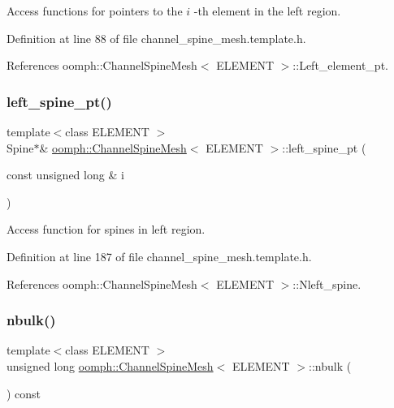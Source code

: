 Access functions for pointers to the $ i $ -\/th element in the left region. 



Definition at line 88 of file channel\+\_\+spine\+\_\+mesh.\+template.\+h.



References oomph\+::\+Channel\+Spine\+Mesh$<$ E\+L\+E\+M\+E\+N\+T $>$\+::\+Left\+\_\+element\+\_\+pt.

\mbox{\label{classoomph_1_1ChannelSpineMesh_ad4ae203f8a69fa3c8f0541ede45d7630}} 
\subsubsection{\texorpdfstring{left\+\_\+spine\+\_\+pt()}{left\_spine\_pt()}}
{\footnotesize\ttfamily template$<$class E\+L\+E\+M\+E\+NT $>$ \\
Spine$\ast$\& \hyperlink{classoomph_1_1ChannelSpineMesh}{oomph\+::\+Channel\+Spine\+Mesh}$<$ E\+L\+E\+M\+E\+NT $>$\+::left\+\_\+spine\+\_\+pt (\begin{DoxyParamCaption}\item[{const unsigned long \&}]{i }\end{DoxyParamCaption})\hspace{0.3cm}{\ttfamily [inline]}}



Access function for spines in left region. 



Definition at line 187 of file channel\+\_\+spine\+\_\+mesh.\+template.\+h.



References oomph\+::\+Channel\+Spine\+Mesh$<$ E\+L\+E\+M\+E\+N\+T $>$\+::\+Nleft\+\_\+spine.

\mbox{\label{classoomph_1_1ChannelSpineMesh_a89f5523009288ce87d2f0d1cbb9fb488}} 
\subsubsection{\texorpdfstring{nbulk()}{nbulk()}}
{\footnotesize\ttfamily template$<$class E\+L\+E\+M\+E\+NT $>$ \\
unsigned long \hyperlink{classoomph_1_1ChannelSpineMesh}{oomph\+::\+Channel\+Spine\+Mesh}$<$ E\+L\+E\+M\+E\+NT $>$\+::nbulk (\begin{DoxyParamCaption}{ }\end{DoxyParamCaption}) const\hspace{0.3cm}{\ttfamily [inline]}}



